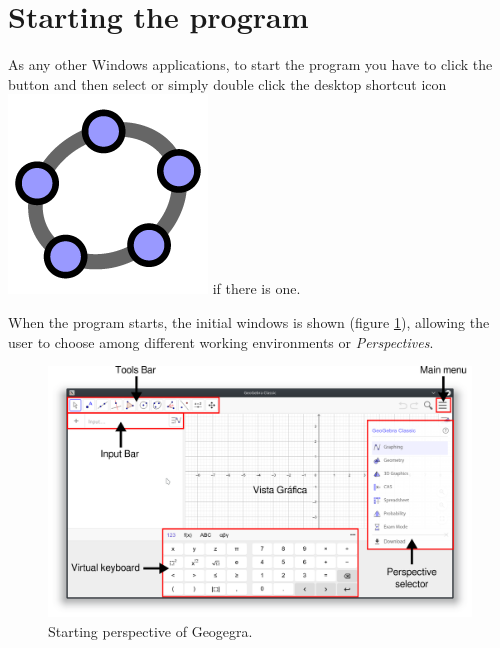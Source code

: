 \section{Starting the program}
As any other Windows applications, to start the program you have to click the  button and then select  or simply double click the desktop shortcut icon \includegraphics[scale=0.04]{img/introduction/geogebra-icon} if there is one.

When the program starts, the initial windows is shown (figure \ref{g:start-window}), allowing the user to choose among different working environments or \emph{Perspectives}.

\begin{figure}[h!]
\begin{center}
\includegraphics[width=\textwidth]{img/introduction/start-window}
\caption{Starting perspective of Geogegra.} \label{g:start-window}
\end{center}
\end{figure}

